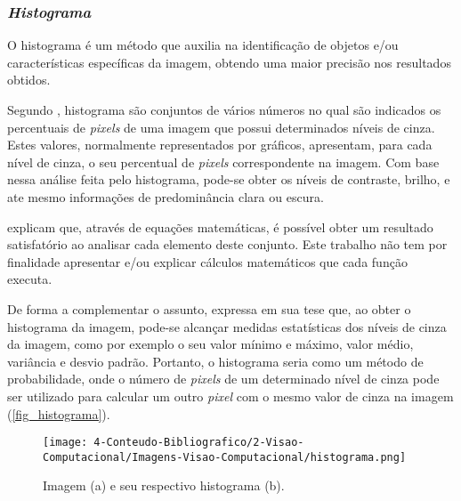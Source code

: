 \subsubsection{\textit{Histograma}}

O histograma é um método que auxilia na identificação de objetos e/ou características específicas da imagem, obtendo uma maior precisão nos resultados obtidos.

Segundo , histograma são conjuntos de vários números no qual são indicados os percentuais de \textit{pixels} de uma imagem que possui determinados níveis de cinza. Estes valores, normalmente representados por gráficos, apresentam, para cada nível de cinza, o seu percentual de \textit{pixels} correspondente na imagem. Com base nessa análise feita pelo histograma, pode-se obter os níveis de contraste, brilho, e ate mesmo informações de predominância clara ou escura.

 explicam que, através de equações matemáticas, é possível obter um resultado satisfatório ao analisar cada elemento deste conjunto. Este trabalho não tem por finalidade apresentar e/ou explicar cálculos matemáticos que cada função executa.

De forma a complementar o assunto,  expressa em sua tese que, ao obter o histograma da imagem, pode-se alcançar medidas estatísticas dos níveis de cinza da imagem, como por exemplo o seu valor mínimo e máximo, valor médio, variância e desvio padrão. Portanto, o histograma seria como um método de probabilidade, onde o número de \textit{pixels} de um determinado nível de cinza pode ser utilizado para calcular um outro \textit{pixel} com o mesmo valor de cinza na imagem (\autoref{fig_histograma}).

\begin{figure}[h]
	\caption{\label{fig_histograma}Imagem (a) e seu respectivo histograma (b).}
	\begin{center}
		\texttt{[image: 4-Conteudo-Bibliografico/2-Visao-Computacional/Imagens-Visao-Computacional/histograma.png]}
	\end{center}
	\centering {}
\end{figure}
